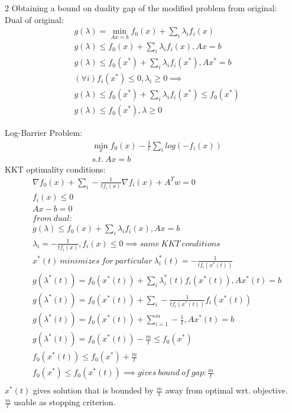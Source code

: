 \documentclass[8pt]{extarticle}
\begin{document}
\begin{multicols*}{2}
  Obtaining a bound on duality gap of the modified problem from original:\\
  Dual of original:
  \begin{align*}
    &g(\lambda) = \min_{Ax=b} f_0(x) + \sum_i \lambda_i f_i(x)\\
    &g(\lambda) \leq f_0(x) + \sum_i \lambda_i f_i(x), Ax=b\\
    &g(\lambda) \leq f_0(x^*) + \sum_i \lambda_i f_i(x^*), Ax^*=b\\
    &(\forall i)f_i(x^*) \leq 0, \lambda_i \geq 0 \implies\\
    &g(\lambda) \leq f_0(x^*) + \sum_i \lambda_i f_i(x^*) \leq f_0(x^*)\\
    &g(\lambda) \leq f_0(x^*), \lambda \geq 0
  \end{align*}

  Log-Barrier Problem:
  \begin{align*}
    &\min_x f_0(x) - \frac{1}{t} \sum_i log(-f_i(x))\\
    & s.t.\ Ax = b    
  \end{align*}
  KKT optimality conditions:
  \begin{align*}
    &\nabla f_0(x) + \sum_i -\frac{1}{t f_i(x)} \nabla f_i(x) + A^T w = 0\\
    &f_i(x) \leq  0\\
    &Ax - b = 0\\
    &from\ dual:\\
    &g(\lambda) \leq f_0(x) + \sum_i \lambda_i f_i(x), Ax=b\\
    &\lambda_i = -\frac{1}{t f_i(x)}, f_i(x) \leq 0 \implies same\ KKT\ conditions\\
    &x^*(t)\ minimizes\ for\ particular\ \lambda_i^*(t) = -\frac{1}{t f_i(x^*(t))}\\
    &g(\lambda^*(t)) = f_0(x^*(t)) + \sum_i \lambda_i^*(t) f_i(x^*(t)), Ax^*(t)=b\\
    &g(\lambda^*(t)) = f_0(x^*(t)) + \sum_i -\frac{1}{t f_i(x^*(t))} f_i(x^*(t))\\
    &g(\lambda^*(t)) = f_0(x^*(t)) + \sum_{i=1}^m -\frac{1}{t}, Ax^*(t)=b\\
    &g(\lambda^*(t)) = f_0(x^*(t)) -\frac{m}{t} \leq f_0(x^*)\\
    &f_0(x^*(t)) \leq f_0(x^*) + \frac{m}{t}\\
    &f_0(x^*) \leq f_0(x^*(t)) \implies gives\ bound\ of\ gap: \frac{m}{t}\\
  \end{align*}
  $x^*(t)$ gives solution that is bounded by $\frac{m}{t}$ away from optimal wrt. objective.\\
  $\frac{m}{t}$ usable as stopping criterion.
  \vfill\null
  \columnbreak


\end{multicols*}
\end{document}
